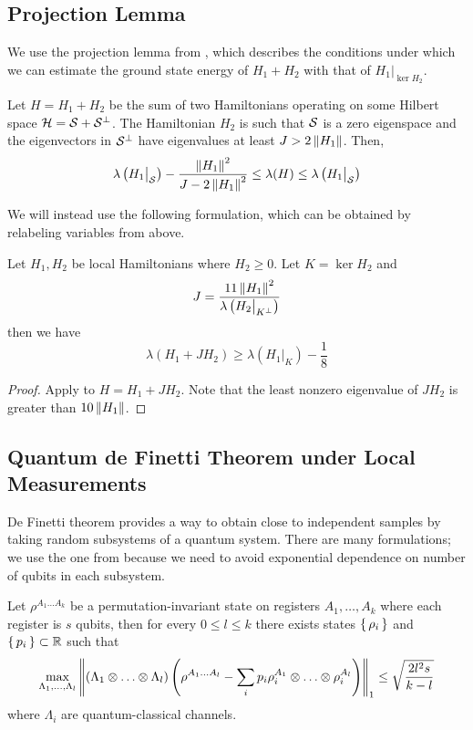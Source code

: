 \subsection{Projection Lemma}

We use the projection lemma from \cite{kempe_kitaev_regev_2006}, which describes the conditions under which we can estimate the ground state energy of $H_1 + H_2$ with that of $H_1\big|_{\ker H_2}$.

\begin{thm}
	\label{thm:proj1}
	Let $H=H_1+H_2$ be the sum of two Hamiltonians operating on some Hilbert space $\mathcal{H}=\mathcal{S}+\mathcal{S}^\bot$.
	The Hamiltonian $H_2$ is such that $\mathcal{S}$ is a zero eigenspace and the eigenvectors in $\mathcal{S}^\bot$ have eigenvalues at least $J>2\left\lVert H_1\right\rVert$. Then,
	$$\lambda\left(H_1\big|_{\mathcal{S}}\right)-\frac{\left\lVert H_1\right\rVert^2}{J-2\left\lVert H_1\right\rVert^2}\leq\lambda(H)\leq\lambda\left(H_1\big|_{\mathcal{S}}\right)$$
\end{thm}

We will instead use the following formulation, which can be obtained by relabeling variables from above.

\begin{thm}
	\label{thm:projection}
	Let $H_1, H_2$ be local Hamiltonians where $H_2\geq0$. Let $K=\ker H_2$ and
	$$J=\frac{11\left\lVert H_1\right\rVert^2}{\lambda\left(H_2\big|_{K^\bot}\right)}$$
	then we have
	$$\lambda(H_1+JH_2)\geq\lambda\left(H_1\big|_K\right)-\frac{1}{8}$$
\end{thm}
\begin{proof}
	Apply  to $H=H_1+JH_2$. Note that the least nonzero eigenvalue of $JH_2$ is greater than $10\left\lVert H_1\right\rVert$.
\end{proof}

\subsection{Quantum de Finetti Theorem under Local Measurements}

De Finetti theorem provides a way to obtain close to independent samples by taking random subsystems of a quantum system.
There are many formulations; we use the one from \cite{Brandão2017} because we need to avoid exponential dependence on number of qubits in each subsystem.
\begin{thm}
	\label{deFinetti}
	Let $\rho^{A_1\ldots A_k}$ be a permutation-invariant state on registers $A_1,\ldots,A_k$ where each register is $s$ qubits,
	then for every $0\leq l\leq k$ there exists states $\set{\rho_i}$ and $\set{p_i}\subset\mathbb{R}$ such that
	$$\max_{\Lambda_1,\ldots,\Lambda_l}
	\left\lVert(\Lambda_1\otimes\ldots\otimes\Lambda_l)\left(\rho^{A_1\ldots A_l}-\sum_ip_i\rho_i^{A_1}\otimes\ldots\otimes\rho_i^{A_l}\right)\right\rVert_1
	\leq\sqrt{\frac{2l^2s}{k-l}}$$
	where $\Lambda_i$ are quantum-classical channels.
\end{thm}

